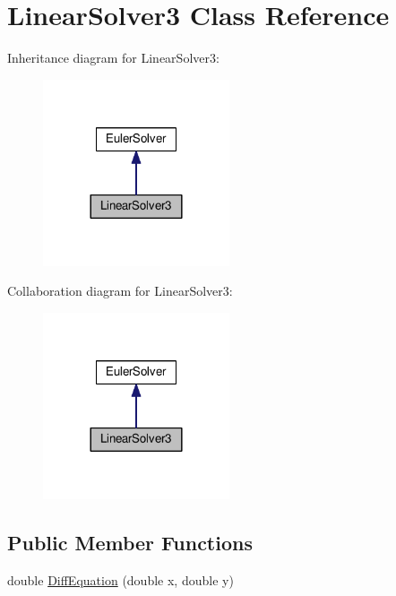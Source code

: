 \hypertarget{classLinearSolver3}{}\section{Linear\+Solver3 Class Reference}
\label{classLinearSolver3}


Inheritance diagram for Linear\+Solver3\+:\nopagebreak
\begin{figure}[H]
\begin{center}
\leavevmode
\includegraphics[width=156pt]{classLinearSolver3__inherit__graph}
\end{center}
\end{figure}


Collaboration diagram for Linear\+Solver3\+:\nopagebreak
\begin{figure}[H]
\begin{center}
\leavevmode
\includegraphics[width=156pt]{classLinearSolver3__coll__graph}
\end{center}
\end{figure}
\subsection*{Public Member Functions}
\begin{DoxyCompactItemize}
\item 
double \hyperlink{classLinearSolver3_a120d9da579b9ba894079ac4a36b51280}{Diff\+Equation} (double x, double y)
\end{DoxyCompactItemize}
